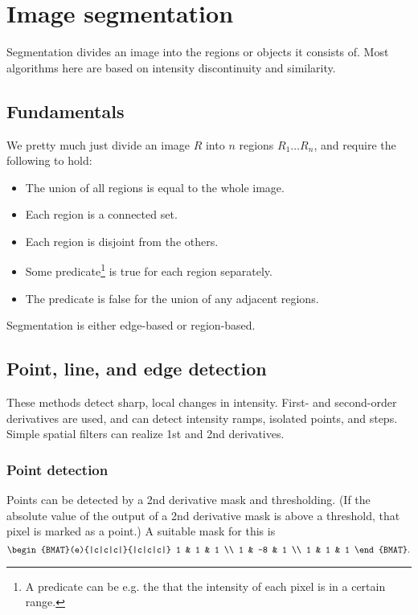 \section{Image segmentation}\label{sec:segmentation}
Segmentation divides an image into the regions or objects it consists of. Most algorithms here are based on intensity discontinuity and similarity.

\subsection{Fundamentals}\label{ssec:segmentation-fundamentals}
We pretty much just divide an image $R$ into $n$ regions $R_1 \dots R_n$, and require the following to hold:
\begin{itemize}
    \item The union of all regions is equal to the whole image.
    \item Each region is a connected set.
    \item Each region is disjoint from the others.
    \item Some predicate\footnote{A predicate can be e.g. the that the intensity of each pixel is in a certain range.} is true for each region separately.
    \item The predicate is false for the union of any adjacent regions.
\end{itemize}

Segmentation is either edge-based or region-based.
\subsection{Point, line, and edge detection}\label{ssec:edge-detection}
These methods detect sharp, local changes in intensity. First- and second-order derivatives are used, and can detect intensity ramps, isolated points, and steps. Simple spatial filters can realize 1st and 2nd derivatives.

\subsubsection{Point detection}
Points can be detected by a 2nd derivative mask and thresholding. (If the absolute value of the output of a 2nd derivative mask is above a threshold, that pixel is marked as a point.) A suitable mask for this is
\begin{equation}\label{eq:2nd-derivative-mask}
    \begin{BMAT}(e){|c|c|c|}{|c|c|c|}
        1 &  1 & 1 \\
        1 & -8 & 1 \\
        1 &  1 & 1
    \end{BMAT}.
\end{equation}


